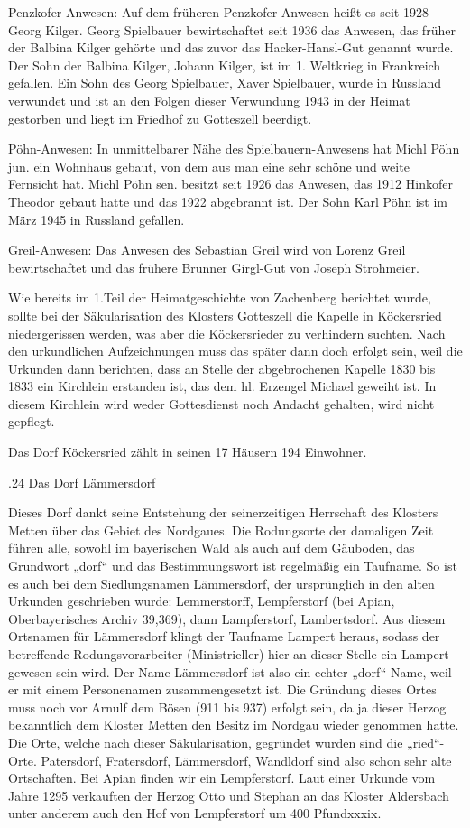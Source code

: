 \documentclass{book}
\begin{document}
Penzkofer-Anwesen: Auf dem früheren Penzkofer-Anwesen heißt es seit 1928 Georg
Kilger. Georg Spielbauer bewirtschaftet seit 1936 das Anwesen, das früher der
Balbina Kilger gehörte und das zuvor das Hacker-Hansl-Gut genannt wurde. Der
Sohn der Balbina Kilger, Johann Kilger, ist im 1. Weltkrieg in Frankreich
gefallen. Ein Sohn des Georg Spielbauer, Xaver Spielbauer, wurde in Russland
verwundet und ist an den Folgen dieser Verwundung 1943 in der Heimat gestorben
und liegt im Friedhof zu Gotteszell beerdigt.

Pöhn-Anwesen: In unmittelbarer Nähe des Spielbauern-Anwesens hat Michl Pöhn jun.
ein Wohnhaus gebaut, von dem aus man eine sehr schöne und weite Fernsicht hat.
Michl Pöhn sen. besitzt seit 1926 das Anwesen, das 1912 Hinkofer Theodor gebaut
hatte und das 1922 abgebrannt ist. Der Sohn Karl Pöhn ist im März 1945 in
Russland gefallen.

Greil-Anwesen: Das Anwesen des Sebastian Greil wird von Lorenz Greil
bewirtschaftet und das frühere Brunner Girgl-Gut von Joseph Strohmeier.

Wie bereits im 1.Teil der Heimatgeschichte von Zachenberg berichtet wurde,
sollte bei der Säkularisation des Klosters Gotteszell die Kapelle in Köckersried
niedergerissen werden, was aber die Köckersrieder zu verhindern suchten. Nach
den urkundlichen Aufzeichnungen muss das später dann doch erfolgt sein, weil die
Urkunden dann berichten, dass an Stelle der abgebrochenen Kapelle 1830 bis 1833
ein Kirchlein erstanden ist, das dem hl. Erzengel Michael geweiht ist. In diesem
Kirchlein wird weder Gottesdienst noch Andacht gehalten, wird nicht gepflegt.

Das Dorf Köckersried zählt in seinen 17 Häusern 194 Einwohner.

.24 Das Dorf Lämmersdorf

Dieses Dorf dankt seine Entstehung der seinerzeitigen Herrschaft des Klosters
Metten über das Gebiet des Nordgaues. Die Rodungsorte der damaligen Zeit führen
alle, sowohl im bayerischen Wald als auch auf dem Gäuboden, das Grundwort „dorf“
und das Bestimmungswort ist regelmäßig ein Taufname. So ist es auch bei dem
Siedlungsnamen Lämmersdorf, der ursprünglich in den alten Urkunden geschrieben
wurde: Lemmerstorff, Lempferstorf (bei Apian, Oberbayerisches Archiv 39,369),
dann Lampferstorf, Lambertsdorf. Aus diesem Ortsnamen für Lämmersdorf klingt der
Taufname Lampert heraus, sodass der betreffende Rodungsvorarbeiter
(Ministrieller) hier an dieser Stelle ein Lampert gewesen sein wird. Der Name
Lämmersdorf ist also ein echter „dorf“-Name, weil er mit einem Personenamen
zusammengesetzt ist. Die Gründung dieses Ortes muss noch vor Arnulf dem Bösen
(911 bis 937) erfolgt sein, da ja dieser Herzog bekanntlich dem Kloster Metten
den Besitz im Nordgau wieder genommen hatte. Die Orte, welche nach dieser
Säkularisation, gegründet wurden sind die „ried“-Orte. Patersdorf, Fratersdorf,
Lämmersdorf, Wandldorf sind also schon sehr alte Ortschaften. Bei Apian finden
wir ein Lempferstorf. Laut einer Urkunde vom Jahre 1295 verkauften der Herzog
Otto und Stephan an das Kloster Aldersbach unter anderem auch den Hof von
Lempferstorf um 400 Pfundxxxix.
\end{document}
